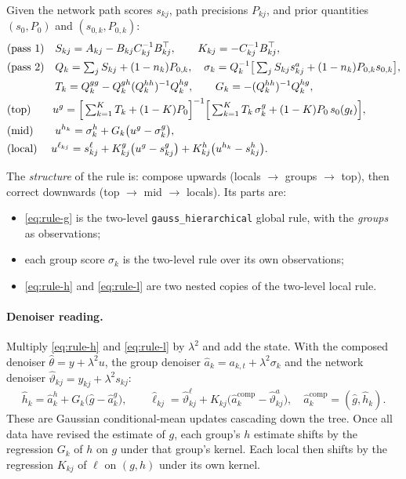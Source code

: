 \documentclass[11pt]{article}
\theoremstyle{definition}
\theoremstyle{remark}
\newcommand{\T}{\top}
\newcommand{\lam}{\lambda}
\newcommand{\arrowm}{\texttt{gauss\_\allowbreak hierarchical}}
\newcommand{\hk}{h_k}
\newcommand{\lkj}{\ell_{kj}}
\begin{document}
\begin{tcolorbox}[colback=blue!3,colframe=blue!40!black,title={Three-level composed score (all latents)}]
Given the network path scores $s_{kj}$, path precisions $P_{kj}$, and prior
quantities $(s_0,P_0)$ and $(s_{0,k},P_{0,k})$:
\begin{align}
&\text{(pass 1)}\quad S_{kj}=A_{kj}-B_{kj}C_{kj}^{-1}B_{kj}^\T,\qquad K_{kj}=-C_{kj}^{-1}B_{kj}^\T,\label{eq:rule-pass1}\\
&\text{(pass 2)}\quad Q_k=\textstyle\sum_jS_{kj}+(1-n_k)P_{0,k},\quad
\sigma_k=Q_k^{-1}\big[\textstyle\sum_jS_{kj}s^a_{kj}+(1-n_k)P_{0,k}s_{0,k}\big],\notag\\
&\hphantom{\text{(pass 2)}}\quad T_k=Q^{gg}_k-Q^{gh}_k(Q^{hh}_k)^{-1}Q^{hg}_k,\qquad G_k=-(Q^{hh}_k)^{-1}Q^{hg}_k,\label{eq:rule-pass2}\\
&\text{(top)}\qquad u^g=\Big[\textstyle\sum_{k=1}^KT_k+(1-K)P_0\Big]^{-1}\Big[\textstyle\sum_{k=1}^KT_k\,\sigma^g_k+(1-K)P_0\,s_0(g_t)\Big],\label{eq:rule-g}\\
&\text{(mid)}\qquad u^{\hk}=\sigma^h_k+G_k\big(u^g-\sigma^g_k\big),\label{eq:rule-h}\\
&\text{(local)}\quad\; u^{\lkj}=s^\ell_{kj}+K^g_{kj}\big(u^g-s^g_{kj}\big)+K^h_{kj}\big(u^{\hk}-s^h_{kj}\big).\label{eq:rule-l}
\end{align}
\end{tcolorbox}

The \emph{structure} of the rule is: compose upwards (locals $\to$ groups $\to$
top), then correct downwards (top $\to$ mid $\to$ locals). Its parts are:
\begin{itemize}
\item \eqref{eq:rule-g} is the two-level \arrowm{} global rule, with the
 \emph{groups} as observations;
\item each group score $\sigma_k$ is the two-level rule over its own observations;
\item \eqref{eq:rule-h} and \eqref{eq:rule-l} are two nested copies of the two-level
 local rule.
\end{itemize}

\paragraph{Denoiser reading.} Multiply \eqref{eq:rule-h} and \eqref{eq:rule-l} by
$\lam^2$ and add the state. With the composed denoiser $\hat\theta=y+\lam^2u$,
the group denoiser $\hat a_k=a_{k,t}+\lam^2\sigma_k$ and the network denoiser
$\hat\vartheta_{kj}=y_{kj}+\lam^2s_{kj}$:
\[
\hat h_k=\hat a^h_k+G_k\big(\hat g-\hat a^g_k\big),\qquad
\hat\ell_{kj}=\hat\vartheta^\ell_{kj}+K_{kj}\big(\hat a_k^{\text{comp}}-\hat\vartheta^{a}_{kj}\big),\quad\hat a_k^{\text{comp}}=(\hat g,\hat h_k).
\]
These are Gaussian conditional-mean updates cascading down the tree. Once all
data have revised the estimate of $g$, each group's $h$ estimate shifts by the
regression $G_k$ of $h$ on $g$ under that group's kernel. Each local then shifts
by the regression $K_{kj}$ of $\ell$ on $(g,h)$ under its own kernel.
\end{document}
